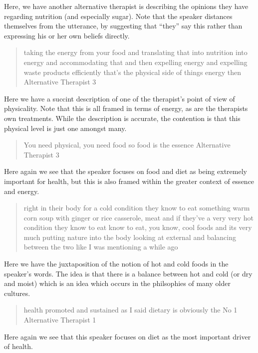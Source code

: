 Here, we have another alternative therapist is describing the opinions they have regarding nutrition (and especially sugar). Note that the speaker distances themselves from the utterance, by suggesting that ``they'' say this rather than expressing his or her own beliefs directly. 

\begin{quotation}
  taking the energy from your food and translating that into nutrition into energy and accommodating that and then expelling energy and expelling waste products efficiently that's the physical side of things energy then
Alternative Therapist 3
\end{quotation}

Here we have a succint description of one of the therapist's point of view of physicality. Note that this is all framed in terms of energy, as are the therapists own treatments. While the description is accurate, the contention is that this physical level is just one amongst many. 

\begin{quotation}
  You need physical, you need food so food is the essence
Alternative Therapist 3
\end{quotation}

Here again we see that the speaker focuses on food and diet as being extremely important for health, but this is also framed within the greater context of essence and energy. 

\begin{quotation}
 right in their body for a cold condition they know to eat something warm corn soup with ginger or rice casserole, meat and if they've a very very hot condition they know to eat know to eat, you know, cool foods and its very much putting nature into the body looking at external and balancing between the two like I was mentioning a while ago


\end{quotation}

Here we have the juxtaposition of the notion of hot and cold foods in the speaker's words. The idea is that there is a balance between hot and cold (or dry and moist) which is an idea which occurs in the philsophies of many older cultures. 

\begin{quotation}
   health promoted and sustained as I said dietary is obviously the No 1
Alternative Therapist 1
\end{quotation}

Here again we see that this speaker focuses on diet as the most important driver of health. 


